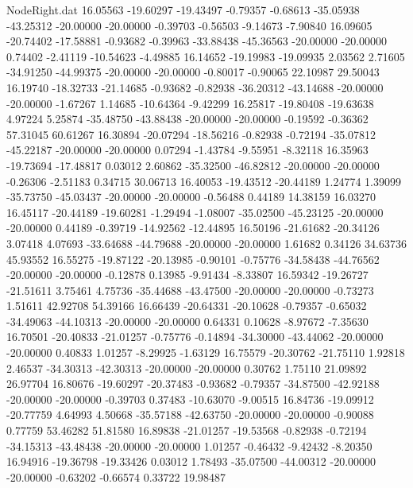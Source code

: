 \begin{filecontents}{NodeRight.dat}
  16.05563  -19.60297  -19.43497    -0.79357   -0.68613  -35.05938  -43.25312  -20.00000  -20.00000   -0.39703   -0.56503   -9.14673   -7.90840
  16.09605  -20.74402  -17.58881    -0.93682   -0.39963  -33.88438  -45.36563  -20.00000  -20.00000    0.74402   -2.41119  -10.54623   -4.49885
  16.14652  -19.19983  -19.09935     2.03562    2.71605  -34.91250  -44.99375  -20.00000  -20.00000   -0.80017   -0.90065   22.10987   29.50043
  16.19740  -18.32733  -21.14685    -0.93682   -0.82938  -36.20312  -43.14688  -20.00000  -20.00000   -1.67267    1.14685  -10.64364   -9.42299
  16.25817  -19.80408  -19.63638     4.97224    5.25874  -35.48750  -43.88438  -20.00000  -20.00000   -0.19592   -0.36362   57.31045   60.61267
  16.30894  -20.07294  -18.56216    -0.82938   -0.72194  -35.07812  -45.22187  -20.00000  -20.00000    0.07294   -1.43784   -9.55951   -8.32118
  16.35963  -19.73694  -17.48817     0.03012    2.60862  -35.32500  -46.82812  -20.00000  -20.00000   -0.26306   -2.51183    0.34715   30.06713
  16.40053  -19.43512  -20.44189     1.24774    1.39099  -35.73750  -45.03437  -20.00000  -20.00000   -0.56488    0.44189   14.38159   16.03270
  16.45117  -20.44189  -19.60281    -1.29494   -1.08007  -35.02500  -45.23125  -20.00000  -20.00000    0.44189   -0.39719  -14.92562  -12.44895
  16.50196  -21.61682  -20.34126     3.07418    4.07693  -33.64688  -44.79688  -20.00000  -20.00000    1.61682    0.34126   34.63736   45.93552
  16.55275  -19.87122  -20.13985    -0.90101   -0.75776  -34.58438  -44.76562  -20.00000  -20.00000   -0.12878    0.13985   -9.91434   -8.33807
  16.59342  -19.26727  -21.51611     3.75461    4.75736  -35.44688  -43.47500  -20.00000  -20.00000   -0.73273    1.51611   42.92708   54.39166
  16.66439  -20.64331  -20.10628    -0.79357   -0.65032  -34.49063  -44.10313  -20.00000  -20.00000    0.64331    0.10628   -8.97672   -7.35630
  16.70501  -20.40833  -21.01257    -0.75776   -0.14894  -34.30000  -43.44062  -20.00000  -20.00000    0.40833    1.01257   -8.29925   -1.63129
  16.75579  -20.30762  -21.75110     1.92818    2.46537  -34.30313  -42.30313  -20.00000  -20.00000    0.30762    1.75110   21.09892   26.97704
  16.80676  -19.60297  -20.37483    -0.93682   -0.79357  -34.87500  -42.92188  -20.00000  -20.00000   -0.39703    0.37483  -10.63070   -9.00515
  16.84736  -19.09912  -20.77759     4.64993    4.50668  -35.57188  -42.63750  -20.00000  -20.00000   -0.90088    0.77759   53.46282   51.81580
  16.89838  -21.01257  -19.53568    -0.82938   -0.72194  -34.15313  -43.48438  -20.00000  -20.00000    1.01257   -0.46432   -9.42432   -8.20350
  16.94916  -19.36798  -19.33426     0.03012    1.78493  -35.07500  -44.00312  -20.00000  -20.00000   -0.63202   -0.66574    0.33722   19.98487

\end{filecontents}
